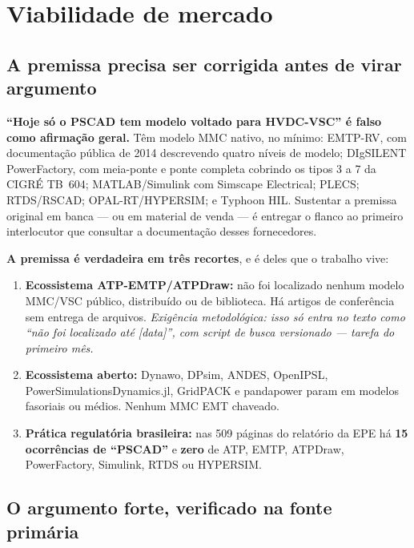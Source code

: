 \documentclass[12pt,a4paper]{article}
\begin{document}
\section{Viabilidade de mercado}
\label{sec:mercado}

\subsection{A premissa precisa ser corrigida antes de virar argumento}

\textbf{\enquote{Hoje só o PSCAD tem modelo voltado para HVDC-VSC} é falso como afirmação geral.}
Têm modelo MMC nativo, no mínimo: EMTP-RV, com documentação pública de 2014 descrevendo quatro níveis
de modelo; DIgSILENT PowerFactory, com meia-ponte e ponte completa cobrindo os tipos 3 a 7 da CIGRÉ
TB~604; MATLAB/Simulink com Simscape Electrical; PLECS; RTDS/RSCAD; OPAL-RT/HYPERSIM; e Typhoon HIL.
Sustentar a premissa original em banca --- ou em material de venda --- é entregar o flanco ao
primeiro interlocutor que consultar a documentação desses fornecedores.

\medskip
\noindent\textbf{A premissa é verdadeira em três recortes}, e é deles que o trabalho vive:

\begin{enumerate}
  \item \textbf{Ecossistema ATP-EMTP/ATPDraw:} não foi localizado nenhum modelo MMC/VSC público,
        distribuído ou de biblioteca. Há artigos de conferência sem entrega de arquivos.
        \emph{Exigência metodológica: isso só entra no texto como \enquote{não foi localizado até
        [data]}, com script de busca versionado --- tarefa do primeiro mês.}
  \item \textbf{Ecossistema aberto:} Dynawo, DPsim, ANDES, OpenIPSL, PowerSimulationsDynamics.jl,
        GridPACK e pandapower param em modelos fasoriais ou médios. Nenhum MMC EMT chaveado.
  \item \textbf{Prática regulatória brasileira:} nas 509 páginas do relatório da EPE há
        \textbf{15 ocorrências de \enquote{PSCAD}} e \textbf{zero} de ATP, EMTP, ATPDraw,
        PowerFactory, Simulink, RTDS ou HYPERSIM.
\end{enumerate}

\subsection{O argumento forte, verificado na fonte primária}
\end{document}
